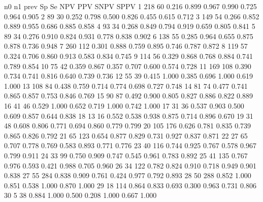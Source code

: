 \documentclass[
  nojss]{jss}
\begin{document}
\begin{CodeChunk}


\begin{CodeOutput}
    n0  n1  prev    Sp    Se   NPV   PPV  SNPV  SPPV
1  218  60 0.216 0.899 0.967 0.990 0.725 0.964 0.905
2   89  30 0.252 0.798 0.500 0.826 0.455 0.615 0.712
3  149  54 0.266 0.852 0.889 0.955 0.686 0.885 0.858
4   93  34 0.268 0.849 0.794 0.919 0.659 0.805 0.841
5   89  34 0.276 0.910 0.824 0.931 0.778 0.838 0.902
6  138  55 0.285 0.964 0.655 0.875 0.878 0.736 0.948
7  260 112 0.301 0.888 0.759 0.895 0.746 0.787 0.872
8  119  57 0.324 0.706 0.860 0.913 0.583 0.834 0.745
9  114  56 0.329 0.868 0.768 0.884 0.741 0.789 0.854
10  75  42 0.359 0.867 0.357 0.707 0.600 0.574 0.728
11 169 108 0.390 0.734 0.741 0.816 0.640 0.739 0.736
12  55  39 0.415 1.000 0.385 0.696 1.000 0.619 1.000
13 108  84 0.438 0.759 0.714 0.774 0.698 0.727 0.748
14  81  74 0.477 0.741 0.865 0.857 0.753 0.846 0.769
15  90  87 0.492 0.900 0.805 0.827 0.886 0.822 0.889
16  41  46 0.529 1.000 0.652 0.719 1.000 0.742 1.000
17  31  36 0.537 0.903 0.500 0.609 0.857 0.644 0.838
18  13  16 0.552 0.538 0.938 0.875 0.714 0.896 0.670
19  31  48 0.608 0.806 0.771 0.694 0.860 0.779 0.799
20 105 176 0.626 0.781 0.835 0.739 0.865 0.826 0.792
21  65 123 0.654 0.877 0.829 0.731 0.927 0.837 0.871
22  27  65 0.707 0.778 0.769 0.583 0.893 0.771 0.776
23  40 116 0.744 0.925 0.767 0.578 0.967 0.799 0.911
24  33  99 0.750 0.909 0.747 0.545 0.961 0.783 0.892
25  41 135 0.767 0.976 0.593 0.421 0.988 0.705 0.960
26  34 122 0.782 0.824 0.910 0.718 0.949 0.901 0.838
27  55 284 0.838 0.909 0.761 0.424 0.977 0.792 0.893
28  50 288 0.852 1.000 0.851 0.538 1.000 0.870 1.000
29  18 114 0.864 0.833 0.693 0.300 0.963 0.731 0.806
30   5  38 0.884 1.000 0.500 0.208 1.000 0.667 1.000
\end{CodeOutput}
\end{CodeChunk}
\end{document}
